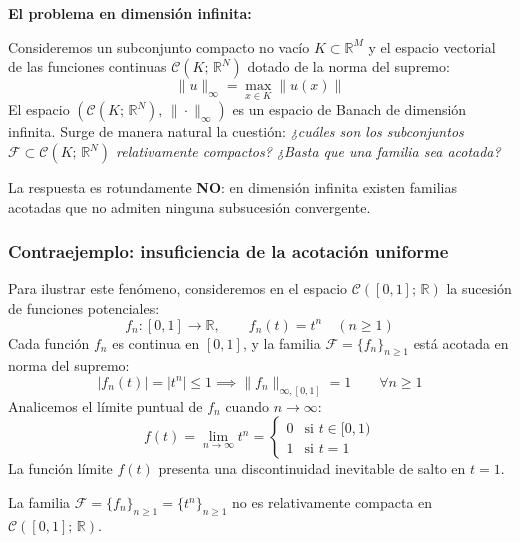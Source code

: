 \textbf{El problema en dimensión infinita:}

Consideremos un subconjunto compacto no vacío $K \subset \mathbb{R}^M$ y el espacio vectorial de las funciones continuas $\mathcal{C}(K; \, \mathbb{R}^N)$ dotado de la norma del supremo:
\[
    \|u\|_\infty = \max_{x \in K} \|u(x)\|
\]
El espacio $(\mathcal{C}(K; \, \mathbb{R}^N), \, \|\cdot\|_\infty)$ es un espacio de Banach de dimensión infinita. Surge de manera natural la cuestión: \textit{¿cuáles son los subconjuntos $\mathcal{F} \subset \mathcal{C}(K; \, \mathbb{R}^N)$ relativamente compactos? ¿Basta que una familia sea acotada?}

La respuesta es rotundamente \textbf{NO}: en dimensión infinita existen familias acotadas que no admiten ninguna subsucesión convergente.

\subsubsection{Contraejemplo: insuficiencia de la acotación uniforme}

Para ilustrar este fenómeno, consideremos en el espacio $\mathcal{C}([0, 1]; \, \mathbb{R})$ la sucesión de funciones potenciales:
\[
    f_n: [0, 1] \to \mathbb{R}, \qquad f_n(t) = t^n \quad (n \geq 1)
\]
Cada función $f_n$ es continua en $[0, 1]$, y la familia $\mathcal{F} = \{f_n\}_{n \geq 1}$ está acotada en norma del supremo:
\[
    |f_n(t)| = |t^n| \leq 1 \implies \|f_n\|_{\infty, [0, 1]} = 1 \qquad \forall n \geq 1
\]
Analicemos el límite puntual de $f_n$ cuando $n \to \infty$:
\[
    f(t) = \lim_{n \to \infty} t^n = \begin{cases}
        0 & \text{si } t \in [0, 1) \\
        1 & \text{si } t = 1
    \end{cases}
\]
La función límite $f(t)$ presenta una discontinuidad inevitable de salto en $t = 1$.

\begin{proposición}
    La familia $\mathcal{F} = \{f_n\}_{n \geq 1} = \{t^n\}_{n \geq 1}$ no es relativamente compacta en $\mathcal{C}([0, 1]; \, \mathbb{R})$.
\end{proposición}

